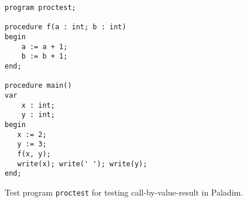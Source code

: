 \begin{figure}[H]
  \begin{lstlisting}[style=paladim]
program proctest;

procedure f(a : int; b : int)
begin
    a := a + 1;
    b := b + 1;
end;

procedure main()
var
    x : int;
    y : int;
begin
   x := 2;
   y := 3;
   f(x, y);
   write(x); write(' '); write(y);
end;
  \end{lstlisting}
  \caption{Test program \texttt{proctest} for testing call-by-value-result
  in \textsf{Paladim}.}
  \label{fig_proctest}
\end{figure}
